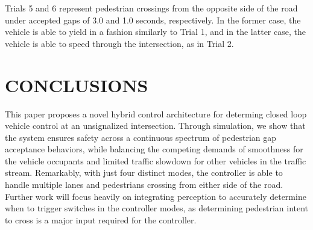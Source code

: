 \documentclass[letterpaper, 10 pt, conference]{ieeeconf}  %
\begin{document}
Trials 5 and 6 represent pedestrian crossings from the opposite side of the road under accepted gaps of 3.0 and 1.0 seconds, respectively. In the former case, the vehicle is able to yield in a fashion similarly to Trial 1, and in the latter case, the vehicle is able to speed through the intersection, as in Trial 2. 

\section{CONCLUSIONS}
This paper proposes a novel hybrid control architecture for determing closed loop vehicle control at an unsignalized intersection. Through simulation, we show that the system ensures safety across a continuous spectrum of pedestrian gap acceptance behaviors, while balancing the competing demands of smoothness for the vehicle occupants and limited traffic slowdown for other vehicles in the traffic stream. Remarkably, with just four distinct modes, the controller is able to handle multiple lanes and pedestrians crossing from either side of the road. Further work will focus heavily on integrating perception to accurately determine when to trigger switches in the controller modes, as determining pedestrian intent to cross is a major input required for the controller. 

\addtolength{\textheight}{-12cm}   %













\end{document}

